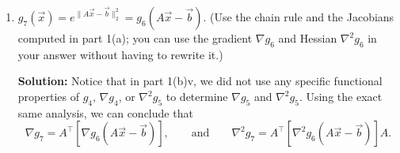 \documentclass[10pt]{article}
\theoremstyle{definition}
\theoremstyle{plain}
\begin{document}
\begin{enumerate}[label=(\alph*)]
\begin{enumerate}[label=\roman*.]
    Notice that the function being differentiated is of the form $f(\vec{x})\vec{x}$, for $f(\vec{x}) = 2e^{\|\vec{x}\|_2^2}$. Thus we obtain
    \begin{align}
    \nabla^2 g_6(\vec{x}) &= D(f(\vec{x})\vec{x}) \\
    &= \vec{x}[\nabla f(\vec{x})]^\top + f(\vec{x})I.
    \end{align}

    It just remains to compute $\nabla f(\vec{x})$, which we compute componentwise using the scalar chain rule, and obtain
    \begin{align}
    [\nabla f(\vec{x})]_j &= \frac{\partial f}{\partial x_j}(\vec{x}) \\
    &= \frac{\partial}{\partial x_j}(2e^{\|\vec{x}\|_2^2}) \\
    &= 2e^{\|\vec{x}\|_2^2}\frac{\partial \|\vec{x}\|_2^2}{\partial x_j} \\
    &= 2e^{\|\vec{x}\|_2^2}[\nabla \|\vec{x}\|_2^2]_j \\
    &= 2e^{\|\vec{x}\|_2^2}[2\vec{x}]_j \\
    &= 4x_j e^{\|\vec{x}\|_2^2}.
    \end{align}

    Thus we have
    \begin{equation}
    \nabla f(\vec{x}) = 4e^{\|\vec{x}\|_2^2}\vec{x}.
    \end{equation}

    This gives
    \begin{align}
    \nabla^2 g_6(\vec{x}) &= 4e^{\|\vec{x}\|_2^2}\vec{x}\vec{x}^\top + 2e^{\|\vec{x}\|_2^2}I \\
    &= 2e^{\|\vec{x}\|_2^2}(I + 2\vec{x}\vec{x}^\top).
    \end{align}

    \item $g_7(\vec{x}) = e^{\|A\vec{x} - \vec{b}\|_2^2} = g_6(A\vec{x} - \vec{b})$. (Use the chain rule and the Jacobians computed in part 1(a); you can use the gradient $\nabla g_6$ and Hessian $\nabla^2 g_6$ in your answer without having to rewrite it.)

    \textbf{Solution:} Notice that in part 1(b)v, we did not use any specific functional properties of $g_4$, $\nabla g_4$, or $\nabla^2 g_5$ to determine $\nabla g_5$ and $\nabla^2 g_5$. Using the exact same analysis, we can conclude that
    \begin{equation}
    \nabla g_7 = A^\top[\nabla g_6(A\vec{x} - \vec{b})], \qquad \text{and} \qquad \nabla^2 g_7 = A^\top[\nabla^2 g_6(A\vec{x} - \vec{b})]A.
    \end{equation}
\end{enumerate}


\end{enumerate}
\end{document}
